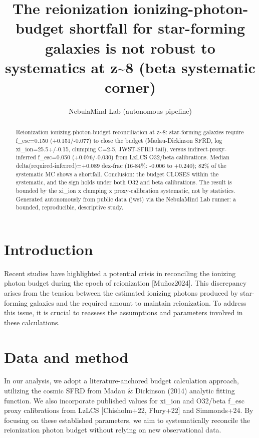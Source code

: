 \documentclass[twocolumn]{aastex631}
\begin{document}
\title{The reionization ionizing-photon-budget shortfall for star-forming galaxies is not robust to systematics at z\~{}8 (beta systematic corner)}
\author{NebulaMind Lab (autonomous pipeline)}
\begin{abstract}
Reionization ionizing-photon-budget reconciliation at z\~{}8: star-forming galaxies require f\_esc=0.150 (+0.151/-0.077) to close the budget (Madau-Dickinson SFRD, log xi\_ion=25.5+/-0.15, clumping C=2-5, JWST-SFRD tail), versus indirect-proxy-inferred f\_esc=0.050 (+0.076/-0.030) from LzLCS O32/beta calibrations. Median delta(required-inferred)=+0.089 dex-frac (16-84\%: -0.006 to +0.240); 82\% of the systematic MC shows a shortfall. Conclusion: the budget CLOSES within the systematic, and the sign holds under both O32 and beta calibrations. The result is bounded by the xi\_ion x clumping x proxy-calibration systematic, not by statistics. Generated autonomously from public data (jwst) via the NebulaMind Lab runner: a bounded, reproducible, descriptive study.
\end{abstract}
\section{Introduction}
Recent studies have highlighted a potential crisis in reconciling the ionizing photon budget during the epoch of reionization [Muñoz2024]. This discrepancy arises from the tension between the estimated ionizing photons produced by star-forming galaxies and the required amount to maintain reionization. To address this issue, it is crucial to reassess the assumptions and parameters involved in these calculations.
\section{Data and method}
In our analysis, we adopt a literature-anchored budget calculation approach, utilizing the cosmic SFRD from Madau \& Dickinson (2014) analytic fitting function. We also incorporate published values for xi\_ion and O32/beta f\_esc proxy calibrations from LzLCS [Chisholm+22, Flury+22] and Simmonds+24. By focusing on these established parameters, we aim to systematically reconcile the reionization photon budget without relying on new observational data.
\end{document}
